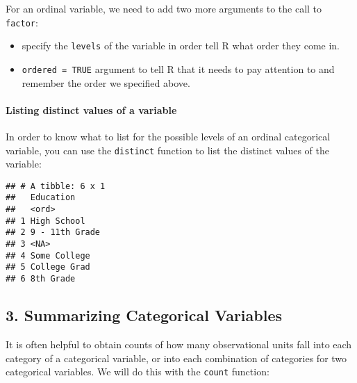 \documentclass[]{article}
\newenvironment{Shaded}{\begin{snugshade}}{\end{snugshade}}
\newcommand{\KeywordTok}[1]{\textcolor[rgb]{0.13,0.29,0.53}{\textbf{#1}}}
\newcommand{\StringTok}[1]{\textcolor[rgb]{0.31,0.60,0.02}{#1}}
\newcommand{\OperatorTok}[1]{\textcolor[rgb]{0.81,0.36,0.00}{\textbf{#1}}}
\newcommand{\NormalTok}[1]{#1}
\providecommand{\tightlist}{%
  \setlength{\itemsep}{0pt}\setlength{\parskip}{0pt}}
\let\oldparagraph\paragraph
\renewcommand{\paragraph}[1]{\oldparagraph{#1}\mbox{}}
\begin{document}
For an ordinal variable, we need to add two more arguments to the call
to \texttt{factor}:

\begin{itemize}
\tightlist
\item
  specify the \texttt{levels} of the variable in order tell R what order
  they come in.
\item
  \texttt{ordered\ =\ TRUE} argument to tell R that it needs to pay
  attention to and remember the order we specified above.
\end{itemize}

\paragraph{Listing distinct values of a
variable}\label{listing-distinct-values-of-a-variable}

In order to know what to list for the possible levels of an ordinal
categorical variable, you can use the \texttt{distinct} function to list
the distinct values of the variable:

\begin{Shaded}
\end{Shaded}

\begin{verbatim}
## # A tibble: 6 x 1
##   Education     
##   <ord>         
## 1 High School   
## 2 9 - 11th Grade
## 3 <NA>          
## 4 Some College  
## 5 College Grad  
## 6 8th Grade
\end{verbatim}

\subsection{3. Summarizing Categorical
Variables}\label{summarizing-categorical-variables}

It is often helpful to obtain counts of how many observational units
fall into each category of a categorical variable, or into each
combination of categories for two categorical variables. We will do this
with the \texttt{count} function:

\begin{Shaded}
\end{Shaded}
\end{document}
